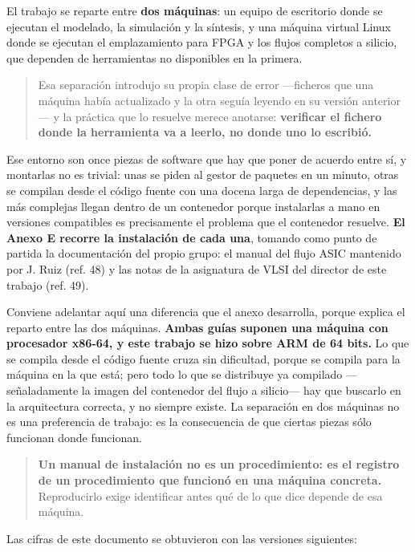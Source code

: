 El trabajo se reparte entre \textbf{dos máquinas}: un equipo de
escritorio donde se ejecutan el modelado, la simulación y la síntesis, y
una máquina virtual Linux donde se ejecutan el emplazamiento para FPGA y
los flujos completos a silicio, que dependen de herramientas no
disponibles en la primera.

\begin{quote}
Esa separación introdujo su propia clase de error ---ficheros que una
máquina había actualizado y la otra seguía leyendo en su versión
anterior--- y la práctica que lo resuelve merece anotarse:
\textbf{verificar el fichero donde la herramienta va a leerlo, no donde
uno lo escribió.}
\end{quote}

Ese entorno son once piezas de software que hay que poner de acuerdo
entre sí, y montarlas no es trivial: unas se piden al gestor de paquetes
en un minuto, otras se compilan desde el código fuente con una docena
larga de dependencias, y las más complejas llegan dentro de un
contenedor porque instalarlas a mano en versiones compatibles es
precisamente el problema que el contenedor resuelve. \textbf{El Anexo E
recorre la instalación de cada una}, tomando como punto de partida la
documentación del propio grupo: el manual del flujo ASIC mantenido por
J. Ruiz (ref. 48) y las notas de la asignatura de VLSI del director de
este trabajo (ref. 49).

Conviene adelantar aquí una diferencia que el anexo desarrolla, porque
explica el reparto entre las dos máquinas. \textbf{Ambas guías suponen
una máquina con procesador x86-64, y este trabajo se hizo sobre ARM de
64 bits.} Lo que se compila desde el código fuente cruza sin dificultad,
porque se compila para la máquina en la que está; pero todo lo que se
distribuye ya compilado ---señaladamente la imagen del contenedor del
flujo a silicio--- hay que buscarlo en la arquitectura correcta, y no
siempre existe. La separación en dos máquinas no es una preferencia de
trabajo: es la consecuencia de que ciertas piezas sólo funcionan donde
funcionan.

\begin{quote}
\textbf{Un manual de instalación no es un procedimiento: es el registro
de un procedimiento que funcionó en una máquina concreta.} Reproducirlo
exige identificar antes qué de lo que dice depende de esa máquina.
\end{quote}

Las cifras de este documento se obtuvieron con las versiones siguientes:

